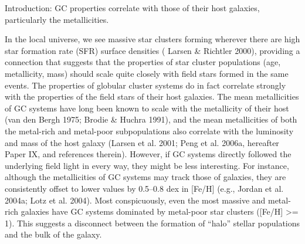 Introduction: GC properties correlate with those of their host galaxies,
particularly the metallicities.

In the local universe, we see massive star clusters forming wherever
there are high star formation rate (SFR) surface densities
( Larsen \& Richtler 2000), providing a connection that suggests
that the properties of star cluster populations (age, metallicity,
mass) should scale quite closely with field stars formed in the same
events. The properties of globular cluster systems do in fact correlate
strongly with the properties of the field stars of their host
galaxies. The mean metallicities of GC systems have long been
known to scale with the metallicity of their host (van den Bergh
1975; Brodie \& Huchra 1991), and the mean metallicities of both
the metal-rich and metal-poor subpopulations also correlate with
the luminosity and mass of the host galaxy (Larsen et al. 2001;
Peng et al. 2006a, hereafter Paper IX, and references therein).
However, if GC systems directly followed the underlying field
light in every way, they might be less interesting. For instance,
although the metallicities of GC systems may track those of galaxies, 
they are consistently offset to lower values by 0.5–0.8 dex
in [Fe/H] (e.g., Jordan et al. 2004a; Lotz et al. 2004). Most conspicuously,
even the most massive and metal-rich galaxies have
GC systems dominated by metal-poor star clusters ([Fe/H] >= 1).
This suggests a disconnect between the formation of ``halo'' stellar
populations and the bulk of the galaxy.
\citep[from][]{2008ApJ...681..197P}
